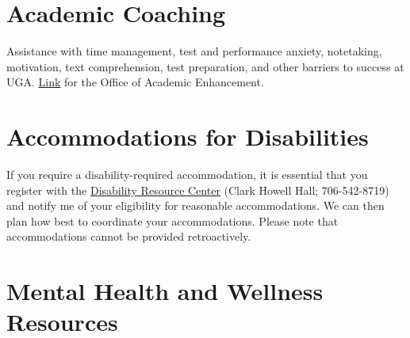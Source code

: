 \documentclass[12pt]{article}
\begin{document}


\vspace{-2mm}
\section*{\normalsize Academic Coaching}
\vspace{-4mm}

Assistance with time management, test and performance anxiety,
notetaking, motivation, text comprehension, test preparation, and
other barriers to success at
UGA. \href{https://dae.uga.edu/services/academic-coaching/}{\color{blue}
  Link} for the Office of Academic Enhancement. 

\vspace{-2mm}
\section*{\normalsize Accommodations for Disabilities}
\vspace{-4mm}

If you require a disability-required accommodation, it is essential
that you register with the \href{https://drc.uga.edu}{Disability Resource Center} (Clark Howell
Hall; 706-542-8719)
and notify me of your eligibility for reasonable accommodations. We
can then plan how best to coordinate your accommodations. Please note
that accommodations cannot be provided retroactively.



\vspace{-2mm}
\section*{\normalsize Mental Health and Wellness Resources}
\vspace{-4mm}
\end{document}
